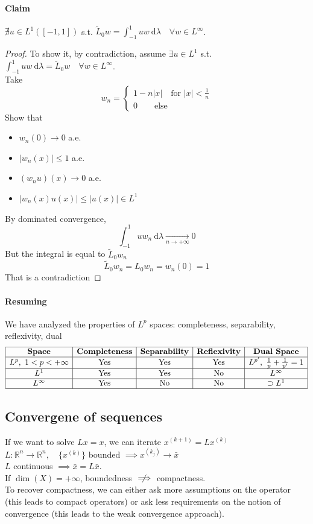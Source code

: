 \paragraph{Claim} $\nexists u\in L^1([-1,1])$ s.t. $\tilde L_0w=\int_{-1}^1 uw\ \mathrm d\lambda\quad \forall w \in L^\infty$.\\
\begin{proof}
    To show it, by contradiction, assume $\exists u \in L^1$ s.t. $\int_{-1}^1 uw\ \mathrm d \lambda =\tilde L_0 w\quad \forall w \in L^\infty$.\\
Take $$w_n=\begin{cases}
    1-n|x|\quad \text{for }|x|<\frac 1n\\0\quad \quad \text{else}
\end{cases}$$
Show that 
\begin{itemize}
    \item $w_n(0)\to 0$ a.e.
    \item $|w_n(x)|\leq 1$ a.e.
    \item $(w_nu)(x)\to 0$ a.e.
    \item $|w_n(x)u(x)|\leq |u(x)|\in L^1$
\end{itemize}
By dominated convergence,
$$\int_{-1}^1 u w_n\ \mathrm d\lambda \xrightarrow[n\to +\infty]{} 0$$
But the integral is equal to $\tilde L_0 w_n$
$$\tilde L_0 w_n = L_0w_n=w_n(0)=1$$
That is a contradiction
\end{proof}
\paragraph{Resuming}
We have analyzed the properties of $L^p$ spaces: completeness, separability, reflexivity, dual
\[
\begin{array}{|c|c|c|c|c|}
\hline
\textbf{Space} & \textbf{Completeness} & \textbf{Separability} & \textbf{Reflexivity} & \textbf{Dual Space} \\ \hline
L^p, \ 1<p<+\infty & \text{Yes} & \text{Yes} & \text{Yes} & L^{p'}, \ \frac{1}{p}+\frac{1}{p'}=1 \\ \hline
L^1 & \text{Yes} & \text{Yes} & \text{No} & L^\infty \\ \hline
L^\infty & \text{Yes} & \text{No} & \text{No} & \supset L^1 \\ \hline
\end{array}
\]

\subsection{Convergene of sequences}
If we want to solve $Lx=x$, we can iterate $x^{(k+1)}=Lx^{(k)}$\\
$L:\mathbb R^n\to \mathbb R^n,\quad \{x^{(k)}\}$ bounded $\implies x^{(k_j)}\to \bar x$\\
$L$ continuous $\implies \bar x=L\bar x$.\\
If $\dim(X)=+\infty$, boundedness $\centernot\implies$ compactness.\\
To recover compactness, we can either ask more assumptions on the operator (this leads to compact operators) or ask less requirements on the notion of convergence (this leads to the weak convergence approach).
